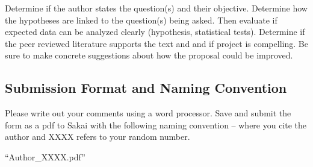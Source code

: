 \documentclass{tufte-handout}\usepackage[]{graphicx}\usepackage[]{color}
\begin{document}
Determine if the author states the question(s) and their objective. Determine how the hypotheses are linked to the question(s) being asked. Then evaluate if expected data can be analyzed clearly (hypothesis, statistical tests). Determine if the peer reviewed literature supports the text and and if project is compelling. Be sure to make concrete suggestions about how the proposal could be improved. 

\subsection{Submission Format and Naming Convention}

Please write out your comments using a word processor. Save and submit the form as a pdf to Sakai with the following naming convention -- where you cite the author and XXXX refers to your random number.

\smallskip
\begin{center}
\noindent ``Author\_XXXX.pdf''
\end{center}
\bigskip



\end{document}
